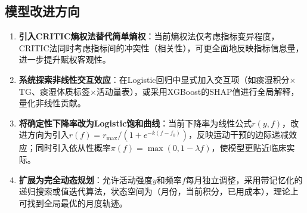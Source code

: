 \documentclass[a4paper,12pt]{ctexart}
\begin{document}
\subsection{模型改进方向}
\begin{enumerate}
    \item \textbf{引入CRITIC熵权法替代简单熵权}：当前熵权法仅考虑指标变异程度，CRITIC法同时考虑指标间的冲突性（相关性），可更全面地反映指标信息量，进一步提升赋权客观性。
    \item \textbf{系统探索非线性交互效应}：在Logistic回归中显式加入交互项（如痰湿积分$\times$TG、痰湿体质标签$\times$活动量表），或采用XGBoost的SHAP值进行全局解释，量化非线性贡献。
    \item \textbf{将确定性下降率改为Logistic饱和曲线}：当前下降率为线性公式$r(y,f)$，改进方向为引入$r(f)=r_{\max}/(1+e^{-k(f-f_0)})$，反映运动干预的边际递减效应；同时引入依从性概率$\pi(f)=\max(0,1-\lambda f)$，使模型更贴近临床实际。
    \item \textbf{扩展为完全动态规划}：允许活动强度$y$和频率$f$每月独立调整，采用带记忆化的递归搜索或值迭代算法，状态空间为（月份，当前积分，已用成本），理论上可找到全局最优的月度轨迹。
\end{enumerate}


\newpage


\end{document}
